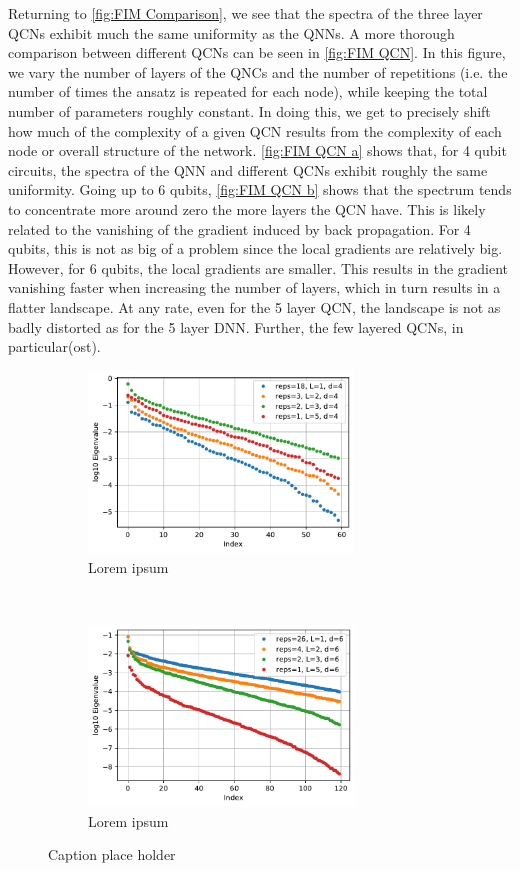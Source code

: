Returning to \autoref{fig:FIM Comparison}, we see that the spectra of the three layer QCNs exhibit much the same uniformity as the QNNs. A more thorough comparison between different QCNs can be seen in \autoref{fig:FIM QCN}. In this figure, we vary the number of layers of the QNCs and the number of repetitions (i.e. the number of times the ansatz is repeated for each node), while keeping the total number of parameters roughly constant. In doing this, we get to precisely shift how much of the complexity of a given QCN results from the complexity of each node or overall structure of the network. \autoref{fig:FIM QCN a} shows that, for 4 qubit circuits, the spectra of the QNN and different QCNs exhibit roughly the same uniformity. Going up to 6 qubits,  \autoref{fig:FIM QCN b} shows that the spectrum tends to concentrate more around zero the more layers the QCN have. This is likely related to the vanishing of the gradient induced by back propagation. For 4 qubits, this is not as big of a problem since the local gradients are relatively big. However, for 6 qubits, the local gradients are smaller. This results in the gradient vanishing faster when increasing the number of layers, which in turn results in a flatter landscape. At any rate, even for the 5 layer QCN, the landscape is not as badly distorted as for the 5 layer DNN. Further, the few layered QCNs, in particular(ost). 


\begin{figure}[H]
    \centering
    \begin{subfigure}[t]{0.5\textwidth}
        \centering
        \includegraphics[height=1.9in]{latex/figures/FIM_qubits_4_comparison.pdf}
        \caption{Lorem ipsum}
        \label{fig:FIM QCN a}
    \end{subfigure}%
    ~ 
    \begin{subfigure}[t]{0.5\textwidth}
        \centering
        \includegraphics[height=1.9in]{latex/figures/FIM_qubits_6_comparison.pdf}
        \caption{Lorem ipsum}
        \label{fig:FIM QCN b}
    \end{subfigure}
    \caption{Caption place holder}
    \label{fig:FIM QCN}
\end{figure}


